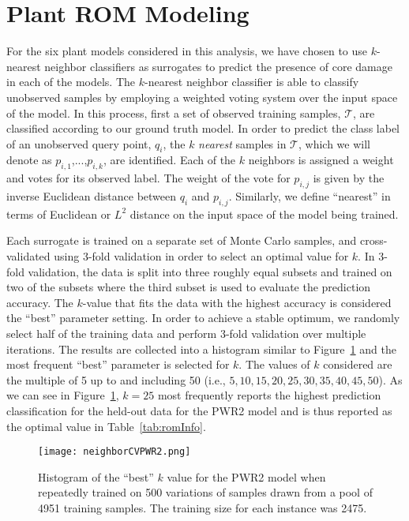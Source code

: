\section{Plant ROM Modeling}
\label{sec:plantRomModeling}

\newcommand{\DPM}[1]{\textcolor{magenta}{#1}}

For the six plant models considered in this analysis, we have chosen to use $k$-nearest neighbor classifiers as surrogates to predict the presence of core damage in each of the models.
%
The $k$-nearest neighbor classifier is able to classify unobserved samples by employing a weighted voting system over the input space of the model.
%
In this process, first a set of observed training samples, $\mathcal{T}$, are classified according to our ground truth model.
%
In order to predict the class label of an unobserved query point, $q_i$, the $k$ \emph{nearest} samples in $\mathcal{T}$, which we will denote as $p_{i,1}$,...,$p_{i,k}$, are identified.
%
Each of the $k$ neighbors is assigned a weight and votes for its observed label.
%
The weight of the vote for $p_{i,j}$ is given by the inverse Euclidean distance between $q_i$ and $p_{i,j}$.
%
Similarly, we define ``nearest'' in terms of Euclidean or $L^2$ distance on the input space of the model being trained.

Each surrogate is trained on a separate set of Monte Carlo samples, and cross-validated using 3-fold validation in order to select an optimal value for $k$.
%
In 3-fold validation, the data is split into three roughly equal subsets and trained on two of the subsets where the third subset is used to evaluate the prediction accuracy.
%
The $k$-value that fits the data with the highest accuracy is considered the ``best'' parameter setting.
%
In order to achieve a stable optimum, we randomly select half of the training data and perform 3-fold validation over multiple iterations.
%
The results are collected into a histogram similar to Figure~\ref{fig:neighborSelection} and the most frequent ``best'' parameter is selected for $k$.
%
The values of $k$ considered are the multiple of 5 up to and including 50 (i.e., $5,10,15,20,25,30,35,40,45,50$).
%
As we can see in Figure~\ref{fig:neighborSelection}, $k=25$ most frequently reports the highest prediction classification for the held-out data for the PWR2 model and is thus reported as the optimal value in Table~\ref{tab:romInfo}.

\begin{figure}[!htbp]
	\centering
	\texttt{[image: neighborCVPWR2.png]}
	\caption{Histogram of the ``best'' $k$ value for the PWR2 model when repeatedly trained on 500 variations of samples drawn from a pool of 4951 training samples. The training size for each instance was 2475.}
	\label{fig:neighborSelection}
\end{figure}

